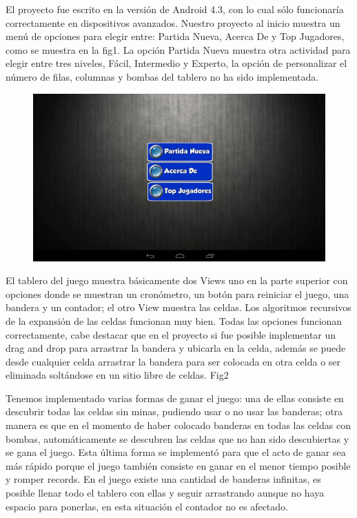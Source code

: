 \documentclass[11pt]{article} %
\begin{document}
El proyecto fue escrito en la versión de Android 4.3, con lo cual sólo funcionaría correctamente en dispositivos avanzados.
Nuestro proyecto al inicio  muestra un menú de opciones para elegir entre: Partida Nueva, Acerca De y Top Jugadores, como se muestra en la fig1. La opción Partida Nueva muestra otra actividad para elegir entre tres niveles, Fácil, Intermedio y Experto, la opción de personalizar el número de filas, columnas y bombas del tablero no ha sido implementada. 

\begin{figure}[H]
 \begin{center}
    \includegraphics{imagenes_Documentacion/fig1}
\end{center}
\caption {}
\label{Figura 1}
\end{figure}



El tablero del juego muestra básicamente dos Views uno en la parte superior con opciones donde se muestran un cronómetro, un botón para reiniciar el juego, una bandera y un contador; el otro View muestra las celdas.  Los algoritmos recursivos de la expansión de las celdas funcionan muy bien. Todas las opciones  funcionan correctamente, cabe destacar que en el proyecto si fue posible implementar un drag and drop para arrastrar la bandera y ubicarla en la celda, además se puede desde cualquier celda arrastrar la bandera para ser colocada en otra celda o ser eliminada soltándose en un sitio libre de celdas. Fig2

Tenemos implementado varias formas de ganar el juego: una de ellas consiste en descubrir todas las celdas sin minas, pudiendo usar o no usar las banderas; otra manera es que en el momento de haber colocado banderas en todas las celdas con bombas, automáticamente se descubren las celdas que no han sido descubiertas y se gana el juego. Esta última forma se implementó para que el acto de ganar sea más rápido porque el juego también consiste en ganar en el menor tiempo posible y romper records. En el juego existe una cantidad de banderas infinitas, es posible llenar todo el tablero con ellas y seguir arrastrando aunque no haya espacio para ponerlas, en esta situación el contador no es afectado.
\end{document}
